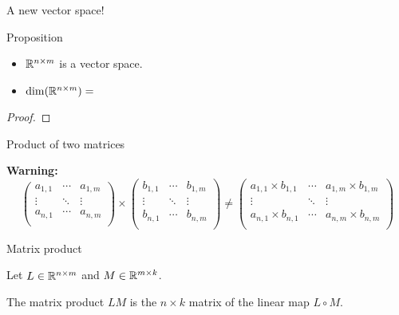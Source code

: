 \documentclass{beamer}
\begin{document}
\begin{frame}[t]{A new vector space!}
	\grid

	\vspace{-0.3cm}
	\begin{block}{Proposition}
		\begin{itemize}
			\item $\mathbb{R}^{n \times m}$ is a vector space. 
			\item ${{\rm dim}}(\mathbb{R}^{n \times m}) = $
		\end{itemize}
	\end{block}
	\begin{proof}
		\vspace{4cm}
		\vfill
	\end{proof}
\end{frame}
\begin{frame}[t]{Product of two matrices}
	\grid

	\textbf{Warning:}
	{\small
		$$
		\!\!\!\!\!\!\!\!\!\!\!\!
		\begin{pmatrix}
			a_{1,1}  & \cdots & a_{1,m} \\
			\vdots & \ddots & \vdots \\
			a_{n,1} & \cdots & a_{n,m} \\
		\end{pmatrix}
		\times
		\begin{pmatrix}
			b_{1,1}  & \cdots & b_{1,m} \\
			\vdots & \ddots & \vdots \\
			b_{n,1} & \cdots & b_{n,m} \\
		\end{pmatrix}
		\neq
		\begin{pmatrix}
			a_{1,1} \times b_{1,1}  & \cdots & a_{1,m} \times b_{1,m} \\
			\vdots & \ddots & \vdots \\
			a_{n,1} \times b_{n,1} & \cdots & a_{n,m} \times b_{n,m} \\
		\end{pmatrix}
		$$
	}
\end{frame}

\begin{frame}[t]{Matrix product}
	\grid

	Let $L \in \mathbb{R}^{n \times m}$ and $M \in \mathbb{R}^{m \times k}$. 
	\begin{definition}
		The matrix product $LM$ is the $n \times k$ matrix of the linear map $L \circ M$.
	\end{definition}
	\vspace{2.7cm}
\end{frame}
\end{document}
